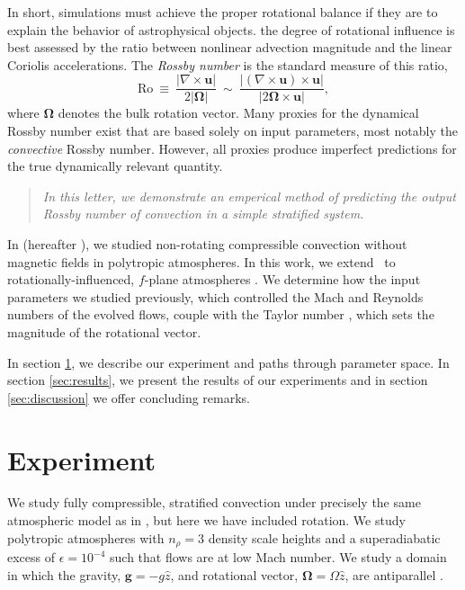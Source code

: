 \documentclass[twocolumn, amsmath, amsfonts, amssymb, trackchanges]{aastex62}
\begin{document}
In short, simulations must achieve the proper rotational balance if they are to explain 
the behavior of astrophysical objects. 
the degree of rotational influence is best assessed by the ratio between 
nonlinear advection magnitude and the linear Coriolis accelerations. 
The \textit{Rossby number} is the standard measure of this ratio, 
\begin{equation}
\text{Ro} \ \equiv \ \frac{| \nabla \times \boldsymbol{u} | }{2 |\bm{\Omega}|} \ 
\sim \ \frac{| (\nabla \times \boldsymbol{u}) \times \boldsymbol{u}  | }{|2 \bm{\Omega} \times \boldsymbol{u}|},
\label{eqn:rossby-def}
\end{equation}
where $\bm{\Omega}$ denotes the bulk rotation vector. 
Many proxies for the dynamical Rossby number exist that are based solely on input parameters, most notably the \textit{convective} Rossby number. 
However, all proxies produce imperfect predictions for the true dynamically relevant quantity.
\begin{quote}
\emph{In this letter, we demonstrate an emperical method of predicting the output Rossby number
of convection in a simple stratified system.}
\end{quote}
In \cite{anders&brown2017} (hereafter \AB), we studied non-rotating compressible convection without magnetic fields in polytropic atmospheres. 
In this work, we extend \AB$\,$ to rotationally-influenced, $f$-plane
atmospheres 
\cite[e.g.][]{brummell&all1996, brummell&all1998, calkins&all2015a}. 
We determine how the input parameters we studied previously, which controlled the Mach and
Reynolds numbers of the evolved flows, couple with the Taylor number \citep[Ta, ][]{julien&all1996}, which sets the magnitude of the rotational vector. 

In section  \ref{sec:experiment}, we describe our experiment and paths through parameter space. 
In section \ref{sec:results}, we present the results of our experiments and in section \ref{sec:discussion} we offer concluding remarks.

\section{Experiment} 
\label{sec:experiment}
We study fully compressible, stratified 
convection under precisely the same atmospheric model
as in \AB, but here
we have included rotation. We study polytropic atmospheres
with $n_\rho = 3$ density scale heights and a superadiabatic
excess of $\epsilon = 10^{-4}$ such that flows are at low Mach number.
We study a domain in which the
gravity, $\bm{g} = -g\hat{z}$, and rotational vector, $\bm{\Omega} = \Omega \hat{z}$, 
are antiparallel \citep[as in e.g.,][]{julien&all1996, brummell&all1996}.
\end{document}

